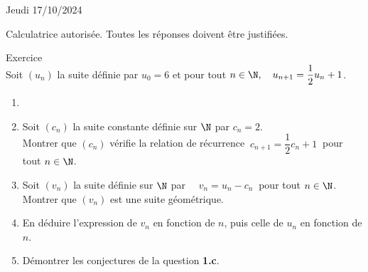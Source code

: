 \documentclass[a4paper,11pt,eval]{nsi}
\newcounter{exoNum}
\newcommand{\exo}[1]
{
	\addtocounter{exoNum}{1}
	{\titlefont\color{UGLiBlue}\Large Exercice\ \theexoNum\ \normalsize{#1}}\smallskip	
}
\begin{document}
\textcolor{UGLiBlue}{Jeudi 17/10/2024}\\
\maketitle
\begin{center}
	Calculatrice autorisée. Toutes les réponses doivent être justifiées.
\end{center}

\vspace*{1cm}

\exo{}\\
Soit $(u_n)$ la suite définie par $u_0=6$ et pour tout $n\in\N, \quad u_{n+1}=\dfrac{1}{2}u_n+1$.
\begin{enumerate}
    \item {}
    \begin{center}
        \def\xmin{-3} \def\ymin{-3}\def\xmax{10}\def\ymax{6}
    \end{center}
    \item Soit $(c_n)$ la suite constante définie sur $\N$ par $c_n=2$.\\
    Montrer que $(c_n)$ vérifie la relation de récurrence $\ c_{n+1}=\dfrac{1}{2}c_n+1\ $ pour tout $n\in\N$.\\[.5em]
    \item Soit $(v_n)$ la suite définie sur $\N$ par $\quad v_n=u_n-c_n\ $ pour tout $n\in\N$.\\
    Montrer que $(v_n)$ est une suite géométrique.\\[.5em]
    \item En déduire l'expression de $v_n$ en fonction de $n$, puis celle de $u_n$ en fonction de $n$.\\[.5em]
    \item Démontrer les conjectures de la question \textbf{1.c}.\\[.5em]
    
\end{enumerate}
\end{document}
